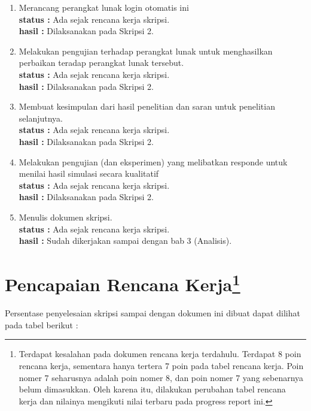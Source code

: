 \documentclass[a4paper,twoside]{article}
\begin{document}
\begin{enumerate}
		\item Merancang perangkat lunak login otomatis ini\\
		{\bf status :} Ada sejak rencana kerja skripsi.\\
		{\bf hasil :} Dilaksanakan pada Skripsi 2.

		\item  Melakukan pengujian terhadap perangkat lunak untuk menghasilkan perbaikan teradap perangkat
lunak tersebut.\\
		{\bf status :} Ada sejak rencana kerja skripsi. \\
		{\bf hasil :} Dilaksanakan pada Skripsi 2.

		\item Membuat kesimpulan dari hasil penelitian dan saran untuk penelitian selanjutnya.\\
		{\bf status :} Ada sejak rencana kerja skripsi.\\
		{\bf hasil :} Dilaksanakan pada Skripsi 2.

		\item Melakukan pengujian (dan eksperimen) yang melibatkan responde untuk menilai hasil simulasi secara kualitatif\\
		{\bf status :} Ada sejak rencana kerja skripsi.\\
		{\bf hasil :} Dilaksanakan pada Skripsi 2.

		\item Menulis dokumen skripsi.\\
		{\bf status :} Ada sejak rencana kerja skripsi.\\
		{\bf hasil :} Sudah dikerjakan sampai dengan bab 3 (Analisis).

	\end{enumerate}

\section{Pencapaian Rencana Kerja\footnote{Terdapat kesalahan pada dokumen rencana kerja terdahulu. Terdapat 8 poin rencana kerja, sementara hanya tertera 7 poin pada tabel rencana kerja. Poin nomer 7 seharusnya adalah poin nomer 8, dan poin nomer 7 yang sebenarnya belum dimasukkan. Oleh karena itu, dilakukan perubahan tabel rencana kerja dan nilainya mengikuti nilai terbaru pada progress report ini.}}
Persentase penyelesaian skripsi sampai dengan dokumen ini dibuat dapat dilihat pada tabel berikut :
\end{document}
